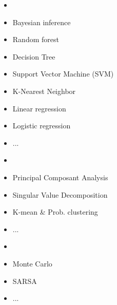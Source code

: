 \documentclass[10pt,serif,mathserif,compress,hyperref={colorlinks}]{beamer}
\begin{document}
\begin{frame}{}

  
  \begin{tcolorbox}[title=Various approaches for ML algorithms]
    {\small
      \begin{minipage}[t]{.55\textwidth}
        \begin{itemize}
        \item<1-> 
        \item<1> Bayesian inference
        \item<1> Random forest
        \item<1> Decision Tree
        \item<1> Support Vector Machine (SVM)
        \item<1> K-Nearest Neighbor
        \item<1> Linear regression
        \item<1> Logistic regression
        \item<1>...
        \end{itemize}
      \end{minipage}\begin{minipage}[t]{.55\textwidth}
        \begin{itemize}
        \item<1-> 
        \item<1> Principal Composant Analysis
        \item<1> Singular Value Decomposition
        \item<1> K-mean \& Prob. clustering
        \item<1>...
        \end{itemize}
        \medskip
        \begin{itemize}
        \item<1->  
        \item<1> Monte Carlo
        \item<1> SARSA
        \item<1>...
        \end{itemize}
        
      \end{minipage}
    }
  \end{tcolorbox}    
\end{frame}
\end{document}
